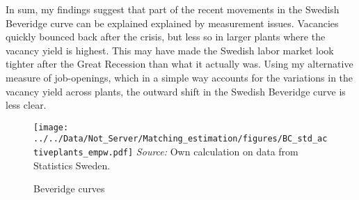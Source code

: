 In sum, my findings suggest that part of the recent movements in the Swedish Beveridge curve can be explained explained by measurement issues. Vacancies quickly bounced back after the crisis, but less so in larger plants where the vacancy yield is highest. This may have made the Swedish labor market look tighter after the Great Recession than what it actually was. Using my alternative measure of job-openings, which in a simple way accounts for the variations in the vacancy yield across plants, the outward shift in the Swedish Beveridge curve is less clear. 


\begin{figure}[h]
\centering
\caption{Beveridge curves}
\texttt{[image: ../../Data/Not\_Server/Matching\_estimation/figures/BC\_std\_activeplants\_empw.pdf]}
\flushleft
\footnotesize{\emph{Source:} Own calculation on data from Statistics Sweden.}
\label{fig:Beveridge}
\end{figure}